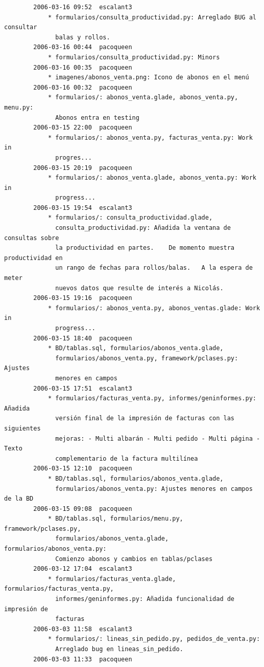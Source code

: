 \documentclass[a4paper]{article}
\begin{document}
\begin{verbatim}
        2006-03-16 09:52  escalant3
            * formularios/consulta_productividad.py: Arreglado BUG al consultar
              balas y rollos.
        2006-03-16 00:44  pacoqueen
            * formularios/consulta_productividad.py: Minors
        2006-03-16 00:35  pacoqueen
            * imagenes/abonos_venta.png: Icono de abonos en el menú
        2006-03-16 00:32  pacoqueen
            * formularios/: abonos_venta.glade, abonos_venta.py, menu.py:
              Abonos entra en testing
        2006-03-15 22:00  pacoqueen
            * formularios/: abonos_venta.py, facturas_venta.py: Work in
              progres...
        2006-03-15 20:19  pacoqueen
            * formularios/: abonos_venta.glade, abonos_venta.py: Work in
              progress...
        2006-03-15 19:54  escalant3
            * formularios/: consulta_productividad.glade,
              consulta_productividad.py: Añadida la ventana de consultas sobre
              la productividad en partes.    De momento muestra productividad en
              un rango de fechas para rollos/balas.   A la espera de meter
              nuevos datos que resulte de interés a Nicolás.
        2006-03-15 19:16  pacoqueen
            * formularios/: abonos_venta.py, abonos_ventas.glade: Work in
              progress...
        2006-03-15 18:40  pacoqueen
            * BD/tablas.sql, formularios/abonos_venta.glade,
              formularios/abonos_venta.py, framework/pclases.py: Ajustes
              menores en campos
        2006-03-15 17:51  escalant3
            * formularios/facturas_venta.py, informes/geninformes.py: Añadida
              versión final de la impresión de facturas con las siguientes
              mejoras: - Multi albarán - Multi pedido - Multi página - Texto
              complementario de la factura multilínea
        2006-03-15 12:10  pacoqueen
            * BD/tablas.sql, formularios/abonos_venta.glade,
              formularios/abonos_venta.py: Ajustes menores en campos de la BD
        2006-03-15 09:08  pacoqueen
            * BD/tablas.sql, formularios/menu.py, framework/pclases.py,
              formularios/abonos_venta.glade, formularios/abonos_venta.py:
              Comienzo abonos y cambios en tablas/pclases
        2006-03-12 17:04  escalant3
            * formularios/facturas_venta.glade, formularios/facturas_venta.py,
              informes/geninformes.py: Añadida funcionalidad de impresión de
              facturas
        2006-03-03 11:58  escalant3
            * formularios/: lineas_sin_pedido.py, pedidos_de_venta.py:
              Arreglado bug en lineas_sin_pedido.
        2006-03-03 11:33  pacoqueen

\end{verbatim}
\end{document}
